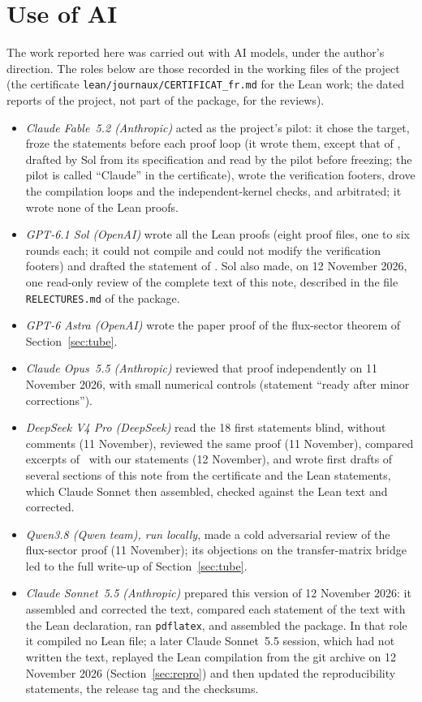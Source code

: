 \documentclass[11pt,a4paper]{article}
\theoremstyle{plain}
\theoremstyle{definition}
\theoremstyle{remark}
\numberwithin{equation}{section}
\newcommand{\lean}[1]{\texttt{\expandafter\leanbk\detokenize{#1}\relax}}
\def\leanbk#1{\ifx#1\relax\else\ifx#1.#1\allowbreak\else\ifx#1_#1\allowbreak\else#1\fi\fi\expandafter\leanbk\fi}
\begin{document}


\section*{Use of AI}\label{sec:ai}
The work reported here was carried out with AI models, under the author's direction. The roles below are those recorded in the working files of the project (the certificate \texttt{lean/journaux/CERTIFICAT\_fr.md} for the Lean work; the dated reports of the project, not part of the package, for the reviews).
\begin{itemize}
\item \emph{Claude Fable~5.2 (Anthropic)} acted as the project's pilot: it chose the target, froze the statements before each proof loop (it wrote them, except that of \lean{wilson_column_flip_bound}, drafted by Sol from its specification and read by the pilot before freezing; the pilot is called ``Claude'' in the certificate), wrote the verification footers, drove the compilation loops and the independent-kernel checks, and arbitrated; it wrote none of the Lean proofs.
\item \emph{GPT-6.1 Sol (OpenAI)} wrote all the Lean proofs (eight proof files, one to six rounds each; it could not compile and could not modify the verification footers) and drafted the statement of \lean{wilson_column_flip_bound}. Sol also made, on 12 November 2026, one read-only review of the complete text of this note, described in the file \texttt{RELECTURES.md} of the package.
\item \emph{GPT-6 Astra (OpenAI)} wrote the paper proof of the flux-sector theorem of Section~\ref{sec:tube}.
\item \emph{Claude Opus~5.5 (Anthropic)} reviewed that proof independently on 11 November 2026, with small numerical controls (statement ``ready after minor corrections'').
\item \emph{DeepSeek V4 Pro (DeepSeek)} read the 18 first statements blind, without comments (11 November), reviewed the same proof (11 November), compared excerpts of~\cite{BB26} with our statements (12 November), and wrote first drafts of several sections of this note from the certificate and the Lean statements, which Claude Sonnet then assembled, checked against the Lean text and corrected.
\item \emph{Qwen3.8 (Qwen team), run locally}, made a cold adversarial review of the flux-sector proof (11 November); its objections on the transfer-matrix bridge led to the full write-up of Section~\ref{sec:tube}.
\item \emph{Claude Sonnet~5.5 (Anthropic)} prepared this version of 12 November 2026: it assembled and corrected the text, compared each statement of the text with the Lean declaration, ran \texttt{pdflatex}, and assembled the package. In that role it compiled no Lean file; a later Claude Sonnet~5.5 session, which had not written the text, replayed the Lean compilation from the git archive on 12 November 2026 (Section~\ref{sec:repro}) and then updated the reproducibility statements, the release tag and the checksums.
\end{itemize}
\end{document}
